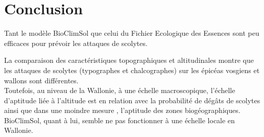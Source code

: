 \section{Conclusion}

Tant le modèle BioClimSol que celui du Fichier Ecologique des Essences sont peu efficaces pour prévoir les attaques de scolytes.

La comparaison des caractéristiques topographiques et altitudinales montre que les attaques de scolytes (typographes et chalcographes) sur les épicéas vosgiens et wallons sont différentes.\\

Toutefois, au niveau de la Wallonie, à une échelle macroscopique, l'échelle d'aptitude liée à l'altitude est en relation avec la probabilité de dégâts de scolytes ainsi que dans une moindre mesure , l'aptitude des zones biogéographiques.\\

BioClimSol, quant à lui, semble ne pas fonctionner à une échelle locale en Wallonie.




